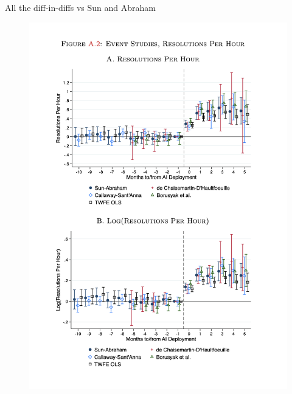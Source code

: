 \documentclass{beamer}
\begin{document}
\begin{frame}{All the diff-in-diffs vs Sun and Abraham}
\begin{multicols}{2}

\begin{figure}
\includegraphics[width=0.95\linewidth, keepaspectratio]{./lecture_includes/genai_did}
\end{figure}


\end{multicols}
\end{frame}
\end{document}
